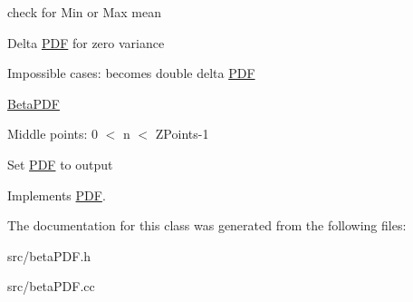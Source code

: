 check for Min or Max mean

Delta \hyperlink{classPDF}{PDF} for zero variance

Impossible cases: becomes double delta \hyperlink{classPDF}{PDF}

\hyperlink{classBetaPDF}{BetaPDF}

Middle points: 0 $<$ n $<$ ZPoints-\/1

Set \hyperlink{classPDF}{PDF} to output 

Implements \hyperlink{classPDF}{PDF}.

The documentation for this class was generated from the following files:\begin{DoxyCompactItemize}
\item 
src/betaPDF.h\item 
src/betaPDF.cc\end{DoxyCompactItemize}
